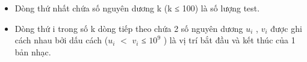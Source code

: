 \begin{itemize}
	\item Dòng thứ nhất chứa số nguyên dương k (k ≤ 100) là số lượng test.
	\item Dòng thứ i trong số k dòng tiếp theo chứa 2 số nguyên dương $u_{i}$ , $v_{i}$ được ghi cách nhau bởi dấu cách ($u_{i}$ $<$ $v_{i}$ ≤ $10^{9}$ ) là vị trí bắt đầu và kết thúc của 1 bản nhạc.
\end{itemize}